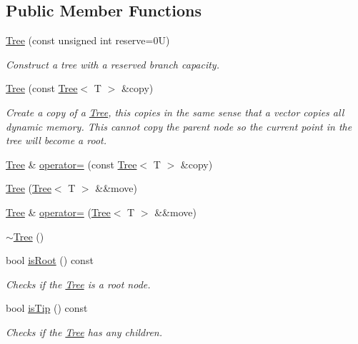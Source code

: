 \subsection*{Public Member Functions}
\begin{DoxyCompactItemize}
\item 
\hyperlink{classTree_a3b1e8570193f05b2123b60037d039886}{Tree} (const unsigned int reserve=0\+U)
\begin{DoxyCompactList}\small\item\em Construct a tree with a reserved branch capacity. \end{DoxyCompactList}\item 
\hyperlink{classTree_aba5a7e24739444eb55f662f68990451d}{Tree} (const \hyperlink{classTree}{Tree}$<$ T $>$ \&copy)
\begin{DoxyCompactList}\small\item\em Create a copy of a \hyperlink{classTree}{Tree}, this copies in the same sense that a vector copies all dynamic memory. This cannot copy the parent node so the current point in the tree will become a root. \end{DoxyCompactList}\item 
\hyperlink{classTree}{Tree} \& \hyperlink{classTree_a44923f2569c8bcd29c08c01c35f34c5f}{operator=} (const \hyperlink{classTree}{Tree}$<$ T $>$ \&copy)
\item 
\hyperlink{classTree_a6715b29a85b15e99666b856951a676cf}{Tree} (\hyperlink{classTree}{Tree}$<$ T $>$ \&\&move)
\item 
\hyperlink{classTree}{Tree} \& \hyperlink{classTree_a6cce6e9bba6a78a237be483ff011eab3}{operator=} (\hyperlink{classTree}{Tree}$<$ T $>$ \&\&move)
\item 
\hyperlink{classTree_a04affc46d89a0ef5d517ab685c9c346e}{$\sim$\+Tree} ()
\item 
bool \hyperlink{classTree_a5057acefe504e6a599a0547f54b9fff9}{is\+Root} () const 
\begin{DoxyCompactList}\small\item\em Checks if the \hyperlink{classTree}{Tree} is a root node. \end{DoxyCompactList}\item 
bool \hyperlink{classTree_ab01ce8c8f54a3a9d954db36edecd6d9c}{is\+Tip} () const 
\begin{DoxyCompactList}\small\item\em Checks if the \hyperlink{classTree}{Tree} has any children. \end{DoxyCompactList}\item 

\end{DoxyCompactItemize}
